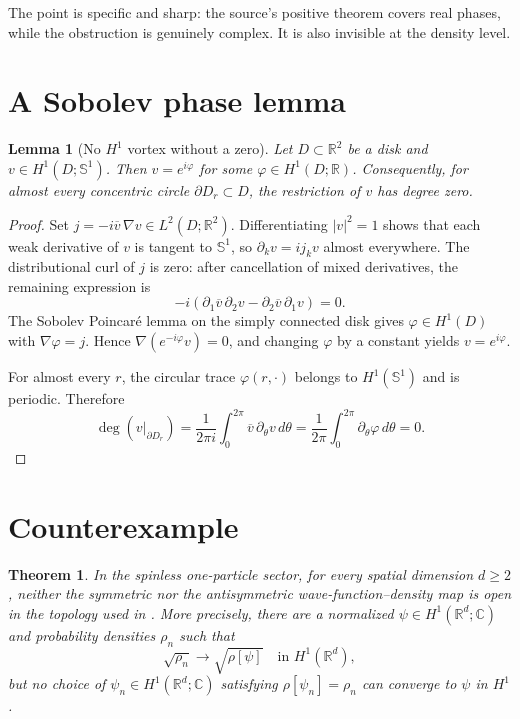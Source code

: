 \documentclass[11pt]{article}
\newtheorem{theorem}{Theorem}
\newtheorem{lemma}{Lemma}
\newcommand{\R}{\mathbb R}
\newcommand{\C}{\mathbb C}
\newcommand{\Sph}{\mathbb S^1}
\begin{document}
The point is specific and sharp: the source's positive theorem covers real phases, while the obstruction is genuinely complex.  It is also invisible at the density level.

\section{A Sobolev phase lemma}

\begin{lemma}[No $H^1$ vortex without a zero]\label{lem:lifting}
Let $D\subset\R^2$ be a disk and $v\in H^1(D;\Sph)$.  Then $v=e^{i\varphi}$ for some $\varphi\in H^1(D;\R)$.  Consequently, for almost every concentric circle $\partial D_r\subset D$, the restriction of $v$ has degree zero.
\end{lemma}

\begin{proof}
Set $j=-i\overline v\,\nabla v\in L^2(D;\R^2)$.  Differentiating $|v|^2=1$ shows that each weak derivative of $v$ is tangent to $\Sph$, so $\partial_kv=i j_kv$ almost everywhere.  The distributional curl of $j$ is zero: after cancellation of mixed derivatives, the remaining expression is
\[
 -i(\partial_1\overline v\,\partial_2v-\partial_2\overline v\,\partial_1v)=0.
\]
The Sobolev Poincar\'e lemma on the simply connected disk gives $\varphi\in H^1(D)$ with $\nabla\varphi=j$.  Hence $\nabla(e^{-i\varphi}v)=0$, and changing $\varphi$ by a constant yields $v=e^{i\varphi}$.

For almost every $r$, the circular trace $\varphi(r,\cdot)$ belongs to $H^1(\Sph)$ and is periodic.  Therefore
\[
 \deg(v|_{\partial D_r})
 =\frac{1}{2\pi i}\int_0^{2\pi}\overline v\,\partial_\theta v\,d\theta
 =\frac{1}{2\pi}\int_0^{2\pi}\partial_\theta\varphi\,d\theta=0.
\]
\end{proof}

\section{Counterexample}

\begin{theorem}\label{thm:counterexample}
In the spinless one-particle sector, for every spatial dimension $d\geq2$, neither the symmetric nor the antisymmetric wave-function--density map is open in the topology used in \cite{source}.  More precisely, there are a normalized $\psi\in H^1(\R^d;\C)$ and probability densities $\rho_n$ such that
\[
 \sqrt{\rho_n}\longrightarrow\sqrt{\rho[\psi]}\quad\text{in }H^1(\R^d),
\]
but no choice of $\psi_n\in H^1(\R^d;\C)$ satisfying $\rho[\psi_n]=\rho_n$ can converge to $\psi$ in $H^1$.
\end{theorem}
\end{document}

